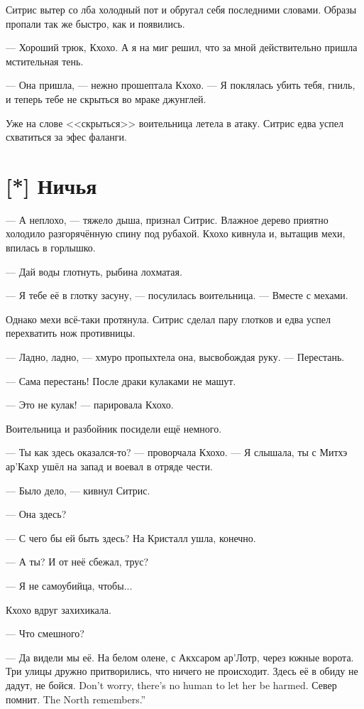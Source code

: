 Ситрис вытер со лба холодный пот и обругал себя последними словами.
Образы пропали так же быстро, как и появились.

--- Хороший трюк, Кхохо.
А я на миг решил, что за мной действительно пришла мстительная тень.

--- Она пришла, --- нежно прошептала Кхохо.
--- Я поклялась убить тебя, гниль, и теперь тебе не скрыться во мраке джунглей.

Уже на слове <<скрыться>> воительница летела в атаку.
Ситрис едва успел схватиться за эфес фаланги.

\section{[*] Ничья}

--- А неплохо, --- тяжело дыша, признал Ситрис.
Влажное дерево приятно холодило разгорячённую спину под рубахой.
Кхохо кивнула и, вытащив мехи, впилась в горлышко.

--- Дай воды глотнуть, рыбина лохматая.

--- Я тебе её в глотку засуну, --- посулилась воительница.
--- Вместе с мехами.

Однако мехи всё-таки протянула.
Ситрис сделал пару глотков и едва успел перехватить нож противницы.

--- Ладно, ладно, --- хмуро пропыхтела она, высвобождая руку.
--- Перестань.

--- Сама перестань!
После драки кулаками не машут.

--- Это не кулак! --- парировала Кхохо.

Воительница и разбойник посидели ещё немного.

--- Ты как здесь оказался-то? --- проворчала Кхохо.
--- Я слышала, ты с Митхэ ар'Кахр ушёл на запад и воевал в отряде чести.

--- Было дело, --- кивнул Ситрис.

--- Она здесь?

--- С чего бы ей быть здесь?
На Кристалл ушла, конечно.

--- А ты?
И от неё сбежал, трус?

--- Я не самоубийца, чтобы...

Кхохо вдруг захихикала.

--- Что смешного?

--- Да видели мы её.
На белом олене, с Акхсаром ар'Лотр, через южные ворота.
Три улицы дружно притворились, что ничего не происходит.
{Здесь её в обиду не дадут, не бойся.}
{Don't worry, there's no human to let her be harmed.}
{Север помнит.}
{The North remembers.''}

